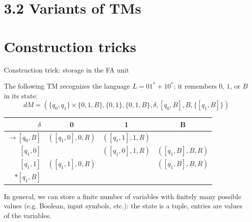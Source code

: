 \documentclass[handout]{beamer}
\begin{document}
\section{3.2 Variants of TMs}


\section*{Construction tricks}


\begin{frame}{Construction trick: storage in the FA unit}

    The following TM recognizes the language $L=01^*+10^*$; it remembers $0$, $1$, or $B$ in its state:
    $$d
    M=(\{q_0,q_1\}\times\{0,1,B\},\{0,1\},\{0,1,B\},\delta,[q_0,B],B,\{[q_1,B]\})
    $$
    \begin{center}
        \begin{tabular}{r |c |c |c }
        $\delta$ & 0 & 1 & B \\
        \hline\hline
        $\rightarrow[q_0,B]$& $([q_1,0],0,R)$& $([q_1,1],1,R)$& \\
        $[q_1,0]$& & $([q_1,0],1,R)$& $([q_1,B],B,R)$ \\
        $[q_1,1]$& $([q_1,1],0,R)$& &$([q_1,B],B,R)$ \\
        $*[q_1,B]$ & & &
        \end{tabular}
    \end{center}

    In general, we can store a finite number of variables with finitely many possible values (e.g. Boolean, input symbols, etc.): the state is a tuple, entries are values of the variables.
    
\end{frame}
\end{document}
